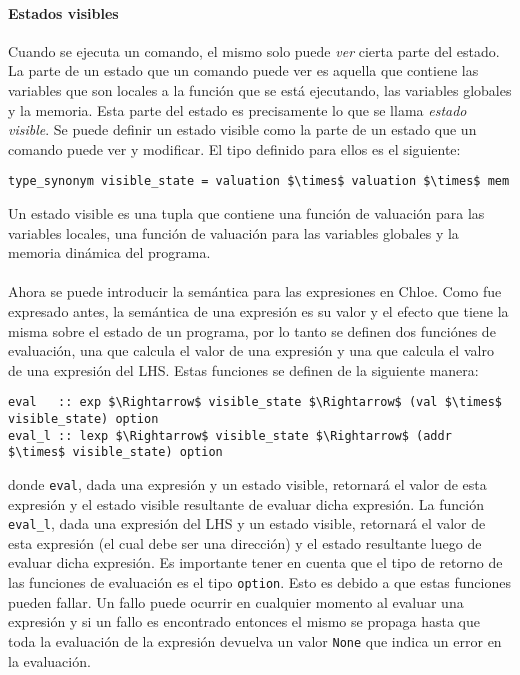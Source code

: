 \paragraph*{Estados visibles}\label{paragraph:visible_state}

Cuando se ejecuta un comando, el mismo solo puede \textit{ver} cierta parte del estado.
La parte de un estado que un comando puede ver es aquella que contiene las variables que son locales a la función que se está ejecutando, las variables globales y la memoria.
Esta parte del estado es precisamente lo que se llama \textit{estado visible}.
Se puede definir un estado visible como la parte de un estado que un comando puede ver y modificar.
El tipo definido para ellos es el siguiente:

\begin{lstlisting}[frame=single, mathescape=true]
type_synonym visible_state = valuation $\times$ valuation $\times$ mem
\end{lstlisting}

Un estado visible es una tupla que contiene una función de valuación para las variables locales, una función de valuación para las variables globales y la memoria dinámica del programa.

\paragraph*{}
Ahora se puede introducir la semántica para las expresiones en Chloe.
Como fue expresado antes, la semántica de una expresión es su valor y el efecto que tiene la misma sobre el estado de un programa, por lo tanto se definen dos funciónes de evaluación, una que calcula el valor de una expresión y una que calcula el valro de una expresión del LHS.
Estas funciones se definen de la siguiente manera:

\begin{lstlisting}[frame=single, mathescape=true]
eval   :: exp $\Rightarrow$ visible_state $\Rightarrow$ (val $\times$ visible_state) option
eval_l :: lexp $\Rightarrow$ visible_state $\Rightarrow$ (addr $\times$ visible_state) option
\end{lstlisting}

donde \verb|eval|, dada una expresión y un estado visible, retornará el valor de esta expresión y el estado visible resultante de evaluar dicha expresión.
La función \verb|eval_l|, dada una expresión del LHS y un estado visible, retornará el valor de esta expresión (el cual debe ser una dirección) y el estado resultante luego de evaluar dicha expresión.
Es importante tener en cuenta que el tipo de retorno de las funciones de evaluación es el tipo \verb|option|.
Esto es debido a que estas funciones pueden fallar.
Un fallo puede ocurrir en cualquier momento al evaluar una expresión y si un fallo es encontrado entonces el mismo se propaga hasta que toda la evaluación de la expresión devuelva un valor \verb|None| que indica un error en la evaluación.


